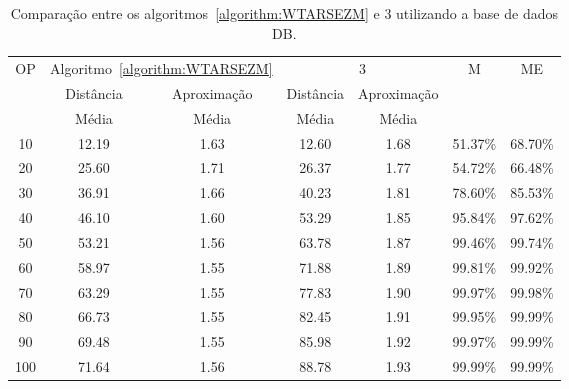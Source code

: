 \begin{table}[!htb]
  \caption{Comparação entre os algoritmos~\ref{algorithm:WTARSEZM} e 3\SbIRT{} utilizando a base de dados DB\textsubscript{\SbIRT}.}
  \label{table:ZZECIDRQ}
  \centering
  \begin{tabular}{|c|c|c|c|c|c|c|}
  \hline
          \multirow{3}{*}{OP} & \multicolumn{2}{c|}{Algoritmo~\ref{algorithm:WTARSEZM}} &     \multicolumn{2}{c|}{3\SbIRT{}}  & \multirow{3}{*}{M} & \multirow{3}{*}{ME} \\ \cline{2-5}
                              &                     Distância &             Aproximação & Distância &             Aproximação &                    &                     \\
                              &                         Média &                   Média &     Média &                   Média &                    &                     \\ \hline
  10                          &                         12.19 &                    1.63 &     12.60 &                    1.68 &            51.37\% &             68.70\% \\ \hline
  20                          &                         25.60 &                    1.71 &     26.37 &                    1.77 &            54.72\% &             66.48\% \\ \hline
  30                          &                         36.91 &                    1.66 &     40.23 &                    1.81 &            78.60\% &             85.53\% \\ \hline
  40                          &                         46.10 &                    1.60 &     53.29 &                    1.85 &            95.84\% &             97.62\% \\ \hline
  50                          &                         53.21 &                    1.56 &     63.78 &                    1.87 &            99.46\% &             99.74\% \\ \hline
  60                          &                         58.97 &                    1.55 &     71.88 &                    1.89 &            99.81\% &             99.92\% \\ \hline
  70                          &                         63.29 &                    1.55 &     77.83 &                    1.90 &            99.97\% &             99.98\% \\ \hline
  80                          &                         66.73 &                    1.55 &     82.45 &                    1.91 &            99.95\% &             99.99\% \\ \hline
  90                          &                         69.48 &                    1.55 &     85.98 &                    1.92 &            99.97\% &             99.99\% \\ \hline
  100                         &                         71.64 &                    1.56 &     88.78 &                    1.93 &            99.99\% &             99.99\% \\ \hline
  \end{tabular}
\end{table}